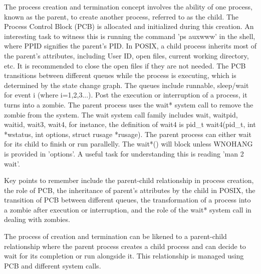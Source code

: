 The process creation and termination concept involves the ability of one process, known as the parent, to create another process, referred to as the child. The Process Control Block (PCB) is allocated and initialized during this creation. An interesting task to witness this is running the command 'ps auxwww' in the shell, where PPID signifies the parent's PID. In POSIX, a child process inherits most of the parent's attributes, including User ID, open files, current working directory, etc. It is recommended to close the open files if they are not needed. The PCB transitions between different queues while the process is executing, which is determined by the state change graph. The queues include runnable, sleep/wait for event i (where i=1,2,3...). Post the execution or interruption of a process, it turns into a zombie. The parent process uses the wait* system call to remove the zombie from the system. The wait system call family includes wait, waitpid, waitid, wait3, wait4, for instance, the definition of wait4 is pid_t wait4(pid_t, int *wstatus, int options, struct rusage *rusage). The parent process can either wait for its child to finish or run parallelly. The wait*() will block unless WNOHANG is provided in 'options'. A useful task for understanding this is reading 'man 2 wait'.
\begin{tcolorbox}[colback=yellow!5, colframe=yellow!80!black, title={\faBookmark\hspace{0.5em}\textbf{\`A retenir}}]
Key points to remember include the parent-child relationship in process creation, the role of PCB, the inheritance of parent's attributes by the child in POSIX, the transition of PCB between different queues, the transformation of a process into a zombie after execution or interruption, and the role of the wait* system call in dealing with zombies.
\end{tcolorbox}
\begin{tcolorbox}[colback=green!5!white, colframe=green!75!black, title={\faLightbulb\hspace{0.5em}Intuition}]
The process of creation and termination can be likened to a parent-child relationship where the parent process creates a child process and can decide to wait for its completion or run alongside it. This relationship is managed using PCB and different system calls.
\end{tcolorbox}

